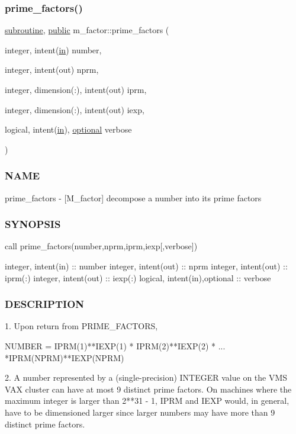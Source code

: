 \subsubsection{\texorpdfstring{prime\+\_\+factors()}{prime\_factors()}}
{\footnotesize\ttfamily \hyperlink{M__stopwatch_83_8txt_acfbcff50169d691ff02d4a123ed70482}{subroutine}, \hyperlink{M__stopwatch_83_8txt_a2f74811300c361e53b430611a7d1769f}{public} m\+\_\+factor\+::prime\+\_\+factors (\begin{DoxyParamCaption}\item[{integer, intent(\hyperlink{M__journal_83_8txt_afce72651d1eed785a2132bee863b2f38}{in})}]{number,  }\item[{integer, intent(out)}]{nprm,  }\item[{integer, dimension(\+:), intent(out)}]{iprm,  }\item[{integer, dimension(\+:), intent(out)}]{iexp,  }\item[{logical, intent(\hyperlink{M__journal_83_8txt_afce72651d1eed785a2132bee863b2f38}{in}), \hyperlink{option__stopwatch_83_8txt_aa4ece75e7acf58a4843f70fe18c3ade5}{optional}}]{verbose }\end{DoxyParamCaption})}



\subsubsection*{N\+A\+ME}

prime\+\_\+factors -\/ \mbox{[}M\+\_\+factor\mbox{]} decompose a number into its prime factors \subsubsection*{S\+Y\+N\+O\+P\+S\+IS}

call prime\+\_\+factors(number,nprm,iprm,iexp\mbox{[},verbose\mbox{]})

integer, intent(in) \+:\+: number integer, intent(out) \+:\+: nprm integer, intent(out) \+:\+: iprm(\+:) integer, intent(out) \+:\+: iexp(\+:) logical, intent(in),optional \+:\+: verbose \subsubsection*{D\+E\+S\+C\+R\+I\+P\+T\+I\+ON}

\begin{DoxyVerb}1. Upon return from PRIME_FACTORS,

        NUMBER = IPRM(1)**IEXP(1) * IPRM(2)**IEXP(2) * ...
                 *IPRM(NPRM)**IEXP(NPRM)

2. A number represented by a (single-precision) INTEGER
   value on the VMS VAX cluster can have at most 9 distinct
   prime factors. On machines where the maximum integer is
   larger than 2**31 - 1, IPRM and IEXP would, in general,
   have to be dimensioned larger since larger numbers may
   have more than 9 distinct prime factors.
\end{DoxyVerb}
